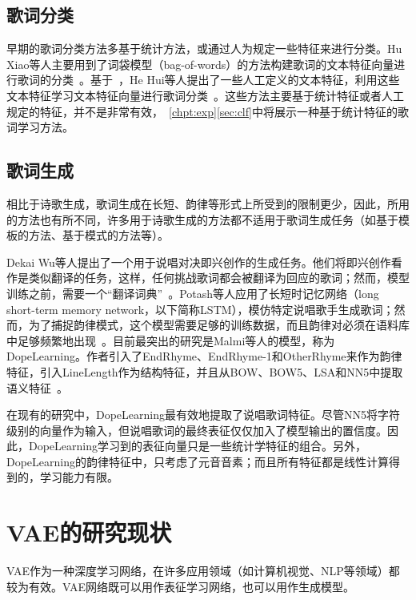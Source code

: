 \subsection{歌词分类}
早期的歌词分类方法多基于统计方法，或通过人为规定一些特征来进行分类。Hu Xiao等人主要用到了词袋模型（bag-of-words）的方法构建歌词的文本特征向量进行歌词的分类~\autocite{hu2009lyric}。基于~\autocite{hu2009lyric}，He Hui等人提出了一些人工定义的文本特征，利用这些文本特征学习文本特征向量进行歌词分类~\autocite{he2008language}。这些方法主要基于统计特征或者人工规定的特征，并不是非常有效，~\ref{chpt:exp}\ref{sec:clf}中将展示一种基于统计特征的歌词学习方法。

\subsection{歌词生成}
相比于诗歌生成，歌词生成在长短、韵律等形式上所受到的限制更少，因此，所用的方法也有所不同，许多用于诗歌生成的方法都不适用于歌词生成任务（如基于模板的方法、基于模式的方法等）。\par

Dekai Wu等人提出了一个用于说唱对决即兴创作的生成任务。他们将即兴创作看作是类似翻译的任务，这样，任何挑战歌词都会被翻译为回应的歌词；然而，模型训练之前，需要一个“翻译词典”~\autocite{wu2013learning}。Potash等人应用了长短时记忆网络（long short-term memory network，以下简称LSTM），模仿特定说唱歌手生成歌词；然而，为了捕捉韵律模式，这个模型需要足够的训练数据，而且韵律对必须在语料库中足够频繁地出现~\autocite{Potash2015GhostWriter}。目前最突出的研究是Malmi等人的模型，称为DopeLearning。作者引入了EndRhyme、EndRhyme-1和OtherRhyme来作为韵律特征，引入LineLength作为结构特征，并且从BOW、BOW5、LSA和NN5中提取语义特征~\autocite{Malmi2016dopelearning}。\par

在现有的研究中，DopeLearning最有效地提取了说唱歌词特征。尽管NN5将字符级别的向量作为输入，但说唱歌词的最终表征仅仅加入了模型输出的置信度。因此，DopeLearning学习到的表征向量只是一些统计学特征的组合。另外，DopeLearning的韵律特征中，只考虑了元音音素；而且所有特征都是线性计算得到的，学习能力有限。\par

\section{VAE的研究现状}
VAE作为一种深度学习网络，在许多应用领域（如计算机视觉、NLP等领域）都较为有效。VAE网络既可以用作表征学习网络，也可以用作生成模型。\par

